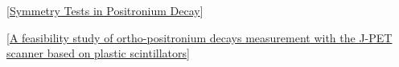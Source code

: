 \begin{thebibliography}{9}

[\href{http://www.int.washington.edu/talks/WorkShops/int_02_3/People/Vetter_P/pstalk.pdf}{Symmetry Tests in Positronium Decay}]

[\href{http://link.springer.com/article/10.1140\%2Fepjc\%2Fs10052-016-4294-3#Fig8}{A feasibility study of ortho-positronium decays measurement with the J-PET scanner based on plastic scintillators}]
\end{thebibliography}
